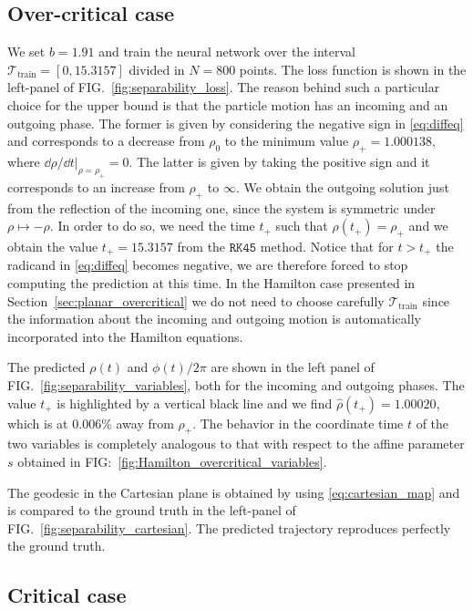 \documentclass[prd,aps,a4paper,eqsecnum,nofootinbib,floatfix,twocolumn,superscriptaddress]{revtex4-2}
\begin{document}
\subsection{\label{subsec:separability_overcritical} Over-critical case}
We set $b=1.91$  and train the neural network over the interval $\mathcal{T}_\mathrm{train}=[0,15.3157]$ divided in $N=800$ points. The loss function is shown in the left-panel of FIG.~\ref{fig:separability_loss}. The reason behind such a particular choice for the upper bound is that the particle motion has an incoming and an outgoing phase. The former is given by considering the negative sign in \eqref{eq:diffeq} and corresponds to a decrease from $\rho_0$ to the minimum value $\rho_+=1.000138$, where $\dd \rho / \dd t \rvert_{\rho=\rho_+}=0$. The latter is given by taking the positive sign and it corresponds to an increase from $\rho_+$ to $\infty$. We obtain the outgoing solution just from the reflection of the incoming one, since the system is symmetric under $\rho\mapsto -\rho$. In order to do so, we need the time $t_+$ such that $\rho(t_+)=\rho_+$ and we obtain the value $t_+=15.3157$ from the $\texttt{RK45}$ method. Notice that for $t>t_+$ the radicand in \eqref{eq:diffeq} becomes negative, we are therefore forced to stop computing the prediction at this time. In the Hamilton case presented in Section~\ref{sec:planar_overcritical} we do not need to choose carefully $\mathcal{T}_\mathrm{train}$ since the information about the incoming and outgoing motion is automatically incorporated into the Hamilton equations.

The predicted $\rho(t)$ and $\phi(t)/2\pi$ are shown in the left panel of FIG.~\ref{fig:separability_variables}, both for the incoming and outgoing phases. The value $t_+$ is highlighted by a vertical black line and we find $\widehat{\rho}(t_+)=1.00020$, which is at $0.006$\% away from $\rho_+$. The behavior in the coordinate time $t$ of the two variables is completely analogous to that with respect to the affine parameter $s$ obtained in FIG:~\ref{fig:Hamilton_overcritical_variables}. 

The geodesic in the Cartesian plane is obtained by using \eqref{eq:cartesian_map} and is compared to the ground truth in the left-panel of FIG.~\ref{fig:separability_cartesian}. The predicted trajectory reproduces perfectly the ground truth.

\subsection{\label{subsec:separability_critical} Critical case}
\end{document}
